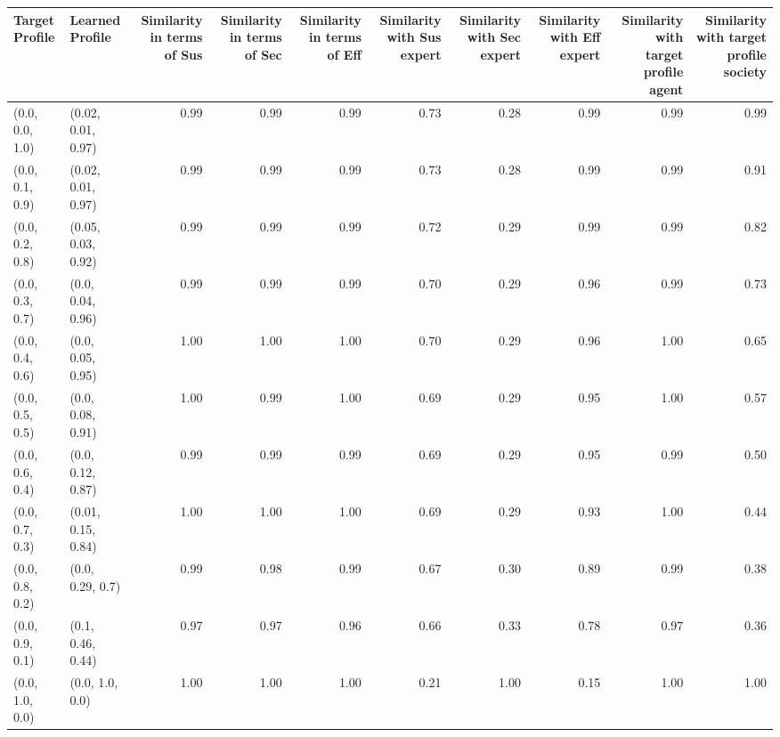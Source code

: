 \begin{tabular}{llrrrrrrrr}
\toprule
Target Profile & Learned Profile & Similarity in terms of Sus & Similarity in terms of Sec & Similarity in terms of Eff & Similarity with Sus expert & Similarity with Sec expert & Similarity with Eff expert & Similarity with target profile agent & Similarity with target profile society \\
\midrule
(0.0, 0.0, 1.0) & (0.02, 0.01, 0.97) & 0.99 & 0.99 & 0.99 & 0.73 & 0.28 & 0.99 & 0.99 & 0.99 \\
(0.0, 0.1, 0.9) & (0.02, 0.01, 0.97) & 0.99 & 0.99 & 0.99 & 0.73 & 0.28 & 0.99 & 0.99 & 0.91 \\
(0.0, 0.2, 0.8) & (0.05, 0.03, 0.92) & 0.99 & 0.99 & 0.99 & 0.72 & 0.29 & 0.99 & 0.99 & 0.82 \\
(0.0, 0.3, 0.7) & (0.0, 0.04, 0.96) & 0.99 & 0.99 & 0.99 & 0.70 & 0.29 & 0.96 & 0.99 & 0.73 \\
(0.0, 0.4, 0.6) & (0.0, 0.05, 0.95) & 1.00 & 1.00 & 1.00 & 0.70 & 0.29 & 0.96 & 1.00 & 0.65 \\
(0.0, 0.5, 0.5) & (0.0, 0.08, 0.91) & 1.00 & 0.99 & 1.00 & 0.69 & 0.29 & 0.95 & 1.00 & 0.57 \\
(0.0, 0.6, 0.4) & (0.0, 0.12, 0.87) & 0.99 & 0.99 & 0.99 & 0.69 & 0.29 & 0.95 & 0.99 & 0.50 \\
(0.0, 0.7, 0.3) & (0.01, 0.15, 0.84) & 1.00 & 1.00 & 1.00 & 0.69 & 0.29 & 0.93 & 1.00 & 0.44 \\
(0.0, 0.8, 0.2) & (0.0, 0.29, 0.7) & 0.99 & 0.98 & 0.99 & 0.67 & 0.30 & 0.89 & 0.99 & 0.38 \\
(0.0, 0.9, 0.1) & (0.1, 0.46, 0.44) & 0.97 & 0.97 & 0.96 & 0.66 & 0.33 & 0.78 & 0.97 & 0.36 \\
(0.0, 1.0, 0.0) & (0.0, 1.0, 0.0) & 1.00 & 1.00 & 1.00 & 0.21 & 1.00 & 0.15 & 1.00 & 1.00 \\
\bottomrule
\end{tabular}
